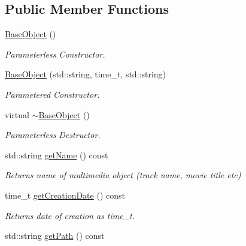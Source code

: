 \subsection*{Public Member Functions}
\begin{DoxyCompactItemize}
\item 
\hypertarget{classBaseObject_ac9e64a371856dc974183c1b04bfdd0c9}{\hyperlink{classBaseObject_ac9e64a371856dc974183c1b04bfdd0c9}{Base\-Object} ()}\label{classBaseObject_ac9e64a371856dc974183c1b04bfdd0c9}

\begin{DoxyCompactList}\small\item\em Parameterless Constructor. \end{DoxyCompactList}\item 
\hypertarget{classBaseObject_aef7d506580d526367abe614c614aaf43}{\hyperlink{classBaseObject_aef7d506580d526367abe614c614aaf43}{Base\-Object} (std\-::string, time\-\_\-t, std\-::string)}\label{classBaseObject_aef7d506580d526367abe614c614aaf43}

\begin{DoxyCompactList}\small\item\em Parametered Constructor. \end{DoxyCompactList}\item 
virtual \hyperlink{classBaseObject_a83eecfd3bdaffda4e6c7d0fb98747f96}{$\sim$\-Base\-Object} ()
\begin{DoxyCompactList}\small\item\em Parameterless Destructor. \end{DoxyCompactList}\item 
\hypertarget{classBaseObject_a813ed6b0e98919c44c5ddf95495bfa2d}{std\-::string \hyperlink{classBaseObject_a813ed6b0e98919c44c5ddf95495bfa2d}{get\-Name} () const }\label{classBaseObject_a813ed6b0e98919c44c5ddf95495bfa2d}

\begin{DoxyCompactList}\small\item\em Returns name of multimedia object (track name, movie title etc) \end{DoxyCompactList}\item 
\hypertarget{classBaseObject_a1d9abdd27cea258333a27d505c57e857}{time\-\_\-t \hyperlink{classBaseObject_a1d9abdd27cea258333a27d505c57e857}{get\-Creation\-Date} () const }\label{classBaseObject_a1d9abdd27cea258333a27d505c57e857}

\begin{DoxyCompactList}\small\item\em Returns date of creation as time\-\_\-t. \end{DoxyCompactList}\item 
\hypertarget{classBaseObject_a46ce6977e2a06f0785aca14454df9d94}{std\-::string \hyperlink{classBaseObject_a46ce6977e2a06f0785aca14454df9d94}{get\-Path} () const }\label{classBaseObject_a46ce6977e2a06f0785aca14454df9d94}


\end{DoxyCompactItemize}
